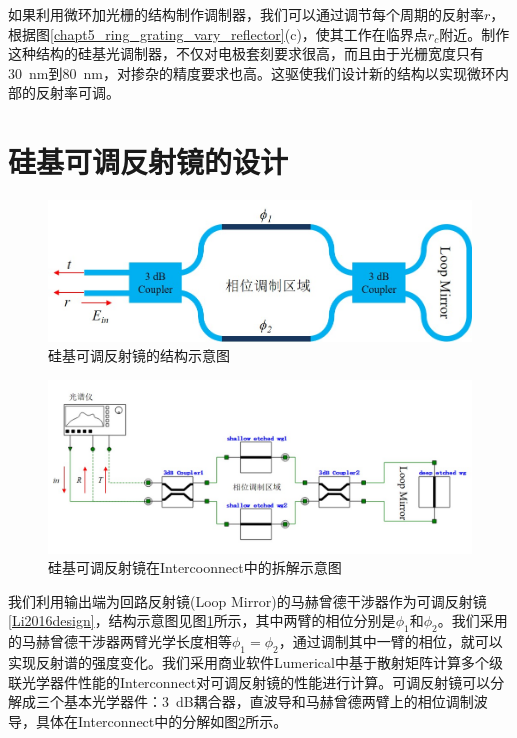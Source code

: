 如果利用微环加光栅的结构制作调制器，我们可以通过调节每个周期的反射率$r$，根据图\ref{chapt5_ring_grating_vary_reflector}(c)，使其工作在临界点$r_c$附近。制作这种结构的硅基光调制器，不仅对电极套刻要求很高，而且由于光栅宽度只有30~nm到80~nm，对掺杂的精度要求也高。这驱使我们设计新的结构以实现微环内部的反射率可调。

\section{硅基可调反射镜的设计} \label{tunable_reflector}
\begin{figure}[htb]
	\centering
	\includegraphics[width=12cm]{./Pictures/chapt5_tunable_reflection_mirror.jpg}
	\caption{硅基可调反射镜的结构示意图}
	\label{chapt5_tunable_reflection_mirror}
\end{figure}
\begin{figure}[htb]
	\centering
	\includegraphics[width=15cm]{./Pictures/chapt5_tunable_reflection_mirror_inter.jpg}
	\caption{硅基可调反射镜在Intercoonnect\cite{interconnect}中的拆解示意图}
	\label{chapt5_tunable_reflection_mirror_inter}
\end{figure}
我们利用输出端为回路反射镜(Loop Mirror)的马赫曾德干涉器作为可调反射镜\ref{Li2016design}，结构示意图见图\ref{chapt5_tunable_reflection_mirror}所示，其中两臂的相位分别是$\phi_1$和$\phi_2$。我们采用的马赫曾德干涉器两臂光学长度相等$\phi_1 = \phi_2$，通过调制其中一臂的相位，就可以实现反射谱的强度变化。我们采用商业软件Lumerical中基于散射矩阵计算多个级联光学器件性能的Interconnect\cite{interconnect}对可调反射镜的性能进行计算。可调反射镜可以分解成三个基本光学器件：3~dB耦合器，直波导和马赫曾德两臂上的相位调制波导，具体在Interconnect中的分解如图\ref{chapt5_tunable_reflection_mirror_inter}所示。
